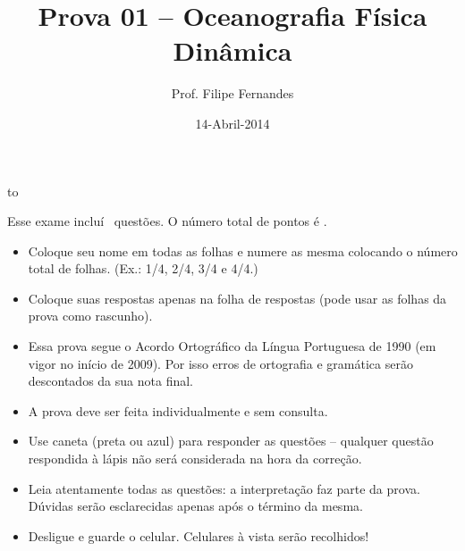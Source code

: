 \documentclass[letterpaper,portuguese,12pt,pdftex]{exam}
\title{Prova 01 -- Oceanografia Física Dinâmica}
\author{Prof. Filipe Fernandes}
\date{14-Abril-2014}
\begin{document}
\maketitle
\doublespacing

\hbox to \textwidth{Nome e número de matrícula:\enspace\hrulefill}
\vspace{0.5cm}

\begin{minipage}{.8\textwidth} %
Esse exame incluí \numquestions\ questões. O número total de pontos é \numpoints.
\vspace{1cm}
{\small
\begin{itemize}
  \item Coloque seu nome em todas as folhas e numere as mesma colocando o
            número total de folhas. (Ex.: 1/4, 2/4, 3/4 e 4/4.)
  \item Coloque suas respostas apenas na folha de respostas (pode usar
            as folhas da prova como rascunho).
  \item Essa prova segue o Acordo Ortográfico da Língua Portuguesa de 1990 (em
            vigor no início de 2009).  Por isso erros de ortografia e gramática
            serão descontados da sua nota final.
  \item A prova deve ser feita individualmente e sem consulta.
  \item Use caneta (preta ou azul) para responder as questões – qualquer questão
            respondida à lápis não será considerada na hora da correção.
  \item Leia atentamente todas as questões: a interpretação faz parte da prova.
            Dúvidas serão esclarecidas apenas após o término da mesma.
  \item Desligue e guarde o celular.  Celulares à vista serão recolhidos!
\end{itemize}
}
\end{minipage}

\newpage
\end{document}
